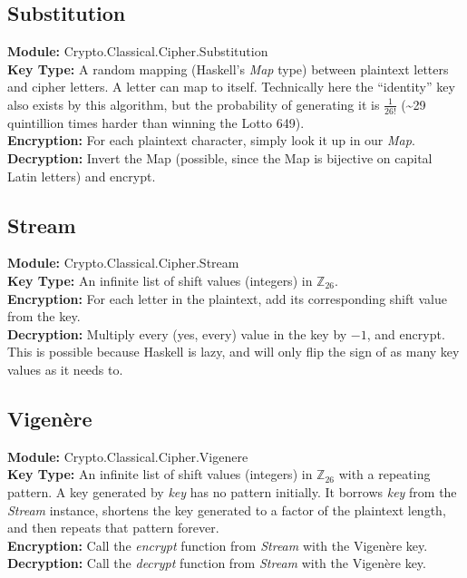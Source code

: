 \documentclass{article}
\begin{document}
\subsection{Substitution}
\textbf{Module:} Crypto.Classical.Cipher.Substitution\\
\textbf{Key Type:} A random mapping (Haskell's \emph{Map} type) between
plaintext letters and cipher letters. A letter can map to itself.
Technically here the ``identity'' key also exists by this algorithm,
but the probability
of generating it is $\frac{1}{26!}$ (\~{}29 quintillion times harder than
winning the Lotto 649).\\
\textbf{Encryption:} For each plaintext character, simply look it up
in our \emph{Map}.\\
\textbf{Decryption:} Invert the Map (possible, since the Map is bijective
on capital Latin letters) and encrypt.

\subsection{Stream}
\textbf{Module:} Crypto.Classical.Cipher.Stream\\
\textbf{Key Type:} An infinite list of shift values (integers) in
$\mathbb{Z}_{26}$.\\
\textbf{Encryption:} For each letter in the plaintext, add its corresponding
shift value from the key.\\
\textbf{Decryption:} Multiply every (yes, every) value in the key by $-1$,
and encrypt. This is possible because Haskell is lazy, and will only
flip the sign of as many key values as it needs to.

\subsection{Vigenère}
\textbf{Module:} Crypto.Classical.Cipher.Vigenere\\
\textbf{Key Type:} An infinite list of shift values (integers) in
$\mathbb{Z}_{26}$ with a repeating pattern.
A key generated by \emph{key} has no pattern initially.
It borrows \emph{key} from the \emph{Stream} instance,
shortens the key generated to a factor of the plaintext length,
and then repeats
that pattern forever.\\
\textbf{Encryption:} Call the \emph{encrypt} function from \emph{Stream}
with the Vigenère key.\\
\textbf{Decryption:} Call the \emph{decrypt} function from \emph{Stream}
with the Vigenère key.
\end{document}
